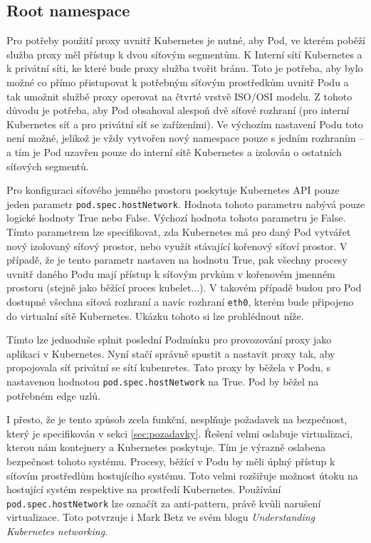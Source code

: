 

\subsection{Root namespace}
Pro potřeby použití proxy uvnitř Kubernetes je nutné, aby Pod, ve kterém poběží služba proxy měl přístup k dvou síťovým segmentům. K Interní sítí Kubernetes a k privátní síti, ke které bude proxy služba tvořit bránu. Toto je potřeba, aby bylo možné co přímo přistupovat k potřebným síťovým prostředkům uvnitř Podu a tak umožnit službě proxy operovat na čtvrté vrstvě ISO/OSI modelu. Z tohoto důvodu je potřeba, aby Pod obsahoval alespoň dvě síťové rozhraní (pro interní Kubernetes síť a pro privátní síť se zařízeními). Ve výchozím nastavení Podu toto není možné, jelikož je vždy vytvořen nový namespace pouze s jedním rozhraním -- a tím je Pod uzavřen pouze do interní sítě Kubernetes a izolován o ostatních síťových segmentů.

Pro konfiguraci síťového jemného prostoru poskytuje Kubernetes API pouze jeden parametr \verb|pod.spec.hostNetwork|. Hodnota tohoto parametru nabývá pouze logické hodnoty True nebo False. Výchozí hodnota tohoto parametru je False. Tímto parametrem lze specifikovat, zda Kubernetes má pro daný Pod vytvářet nový izolovaný síťový prostor, nebo využít stávající kořenový síťoví prostor. V případě, že je tento parametr nastaven na hodnotu True, pak všechny procesy uvnitř daného Podu mají přístup k síťovým prvkům v kořenovém jmenném prostoru (stejně jako běžící proces kubelet...). V takovém případě budou pro Pod dostupné všechna síťová rozhraní a navíc rozhraní \verb|eth0|, kterém bude připojeno do virtualní sítě Kubernetes. Ukázku tohoto si lze prohlédnout níže.



Tímto lze jednoduše splnit poslední Podmínku pro provozování proxy jako aplikaci v Kubernetes. Nyní stačí správně spustit a nastavit proxy tak, aby propojovala síť privátní se sítí kubenretes. Tato proxy by běžela v Podu, s nastavenou hodnotou \verb|pod.spec.hostNetwork| na True. Pod by běžel na potřebném edge uzlů.

I přesto, že je tento způsob zcela funkční, nesplňuje požadavek na bezpečnost, který je specifikován v sekci \ref{sec:pozadavky}. Řešení velmi oslabuje virtualizaci, kterou nám kontejnery a Kubernetes poskytuje. Tím je výrazně oslabena bezpečnost tohoto systému. Procesy, běžící v Podu by měli úplný přístup k síťovím prostředlům hostujícího systému. Toto velmi rozšiřuje možnost útoku na hostující systém respektive na prostředí Kubernetes. Používání \verb|pod.spec.hostNetwork| lze označít za anti-pattern, právě kvůli narušení virtualizace. Toto potvrzuje i Mark Betz ve svém blogu \textit{Understanding Kubernetes networking}. 

